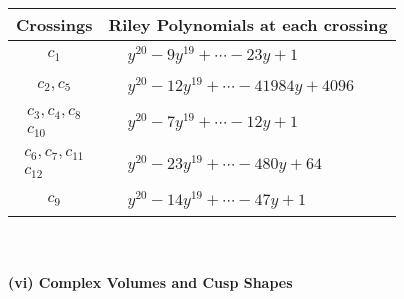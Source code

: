 \documentclass[1p]{elsarticle_modified}
\theoremstyle{definition}
\begin{document}
\begin{tabular}{m{50pt}|m{274pt}}
Crossings & \hspace{64pt}Riley Polynomials at each crossing \\
\hline $$\begin{aligned}c_{1}\end{aligned}$$&$\begin{aligned}
&y^{20}-9 y^{19}+\cdots-23 y+1
\end{aligned}$\\
\hline $$\begin{aligned}c_{2},c_{5}\end{aligned}$$&$\begin{aligned}
&y^{20}-12 y^{19}+\cdots-41984 y+4096
\end{aligned}$\\
\hline $$\begin{aligned}c_{3},c_{4},c_{8}\\c_{10}\end{aligned}$$&$\begin{aligned}
&y^{20}-7 y^{19}+\cdots-12 y+1
\end{aligned}$\\
\hline $$\begin{aligned}c_{6},c_{7},c_{11}\\c_{12}\end{aligned}$$&$\begin{aligned}
&y^{20}-23 y^{19}+\cdots-480 y+64
\end{aligned}$\\
\hline $$\begin{aligned}c_{9}\end{aligned}$$&$\begin{aligned}
&y^{20}-14 y^{19}+\cdots-47 y+1
\end{aligned}$\\
\hline
\end{tabular}\\~\\
\newpage\flushleft \textbf{(vi) Complex Volumes and Cusp Shapes}
\end{document}
